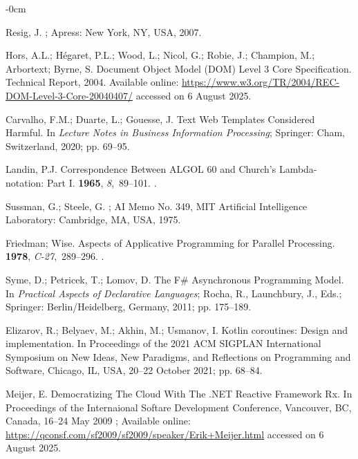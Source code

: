 \documentclass[software,article,accept,pdftex,moreauthors]{Definitions/mdpi}
\begin{document}
\begin{adjustwidth}{-\extralength}{0cm}
\begin{thebibliography}{999}
Resig, J.
; Apress: New York, NY, USA, 2007.

Hors, A.L.; Hégaret, P.L.; Wood, L.; Nicol, G.; Robie, J.; Champion, M.;
  Arbortext; Byrne, S.
\newblock Document Object Model (DOM) Level 3 Core Specification.
\newblock Technical Report, 2004. Available online: \url{https://www.w3.org/TR/2004/REC-DOM-Level-3-Core-20040407/} accessed on 6 August 2025.

Carvalho, F.M.; Duarte, L.; Gouesse, J.  
\newblock Text Web Templates Considered Harmful.  
\newblock In {\em Lecture Notes in Business Information Processing}; Springer: Cham, Switzerland, 2020; pp. 69--95.

Landin, P.J.
\newblock Correspondence Between ALGOL 60 and Church's Lambda-notation: Part I.
 {\bf 1965}, {\em 8},~89--101.
.

Sussman, G.; Steele, G.  
;  
AI Memo No. 349, MIT Artificial Intelligence Laboratory: Cambridge, MA, USA, 1975.

Friedman; Wise.
\newblock Aspects of Applicative Programming for Parallel Processing.
 {\bf 1978}, {\em
  C-27},~289--296.
.

Syme, D.; Petricek, T.; Lomov, D.
\newblock The F{\#} Asynchronous Programming Model.
\newblock In \emph{Practical Aspects of Declarative Languages};
  Rocha, R., Launchbury, J., Eds.; Springer: Berlin/Heidelberg, Germany, 2011; pp. 175--189.

Elizarov, R.; Belyaev, M.; Akhin, M.; Usmanov, I.
\newblock Kotlin coroutines: Design and implementation.
\newblock In Proceedings of the 2021 ACM SIGPLAN
  International Symposium on New Ideas, New Paradigms, and Reflections on
  Programming and Software, Chicago, IL, USA, 20--22 October 2021; pp. 68--84.

Meijer, E.
\newblock Democratizing The Cloud With The .NET Reactive Framework Rx.
\newblock In Proceedings of the Internaional Softare Development Conference, Vancouver, BC, Canada, 16--24 May 2009 
;  Available online: \url{https://qconsf.com/sf2009/sf2009/speaker/Erik+Meijer.html} accessed on 6 August 2025.



\end{thebibliography}
\end{adjustwidth}
\end{document}
